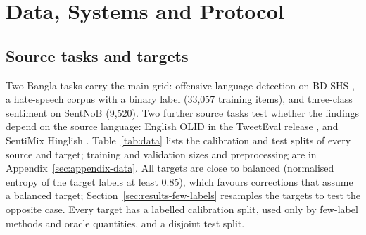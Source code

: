 \section{Data, Systems and Protocol}
\label{sec:data-protocol}

\subsection{Source tasks and targets}
\label{sec:data}

Two Bangla tasks carry the main grid: offensive-language detection on BD-SHS \citep{romim2022bdshs}, a hate-speech
corpus with a binary label (33{,}057 training items), and three-class sentiment on SentNoB \citep{islam2021sentnob}
(9{,}520). Two further source tasks test whether the findings depend on the source language: English OLID
\citep{zampieri2019olid} in the TweetEval release \citep{barbieri2020tweeteval}, and SentiMix Hinglish
\citep{patwa2020sentimix}. Table~\ref{tab:data} lists the calibration and test splits of every source and target;
training and validation sizes and preprocessing are in Appendix~\ref{sec:appendix-data}. All targets are close to
balanced (normalised entropy of the target labels at least 0.85), which favours corrections that assume a balanced
target; Section~\ref{sec:results-few-labels} resamples the targets to test the opposite case. Every target has a labelled
calibration split, used only by few-label methods and oracle quantities, and a disjoint test split.

